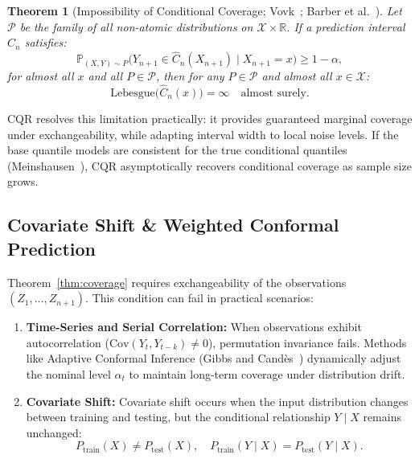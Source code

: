 \documentclass[journal]{IEEEtran}
\newtheorem{theorem}{Theorem}
\begin{document}
\begin{theorem}[Impossibility of Conditional Coverage; Vovk~\cite{vovk2012}; Barber et al.~\cite{barber2021}]\label{thm:impossibility}
Let $\mathcal{P}$ be the family of all non-atomic distributions on $\mathcal{X} \times \mathbb{R}$. If a prediction interval $\hat{C}_n$ satisfies:
\begin{equation}
\mathbb{P}_{(X, Y) \sim P}\big(Y_{n+1} \in \hat{C}_n(X_{n+1}) \mid X_{n+1} = x\big) \ge 1 - \alpha,
\end{equation}
for almost all $x$ and all $P \in \mathcal{P}$, then for any $P \in \mathcal{P}$ and almost all $x \in \mathcal{X}$:
\begin{equation}
\text{Lebesgue}\big(\hat{C}_n(x)\big) = \infty \quad \text{almost surely.}
\end{equation}
\end{theorem}

CQR resolves this limitation practically: it provides guaranteed marginal coverage under exchangeability, while adapting interval width to local noise levels. If the base quantile models are consistent for the true conditional quantiles (Meinshausen~\cite{meinshausen2006}), CQR asymptotically recovers conditional coverage as sample size grows.

\subsection{Covariate Shift \& Weighted Conformal Prediction}
Theorem~\ref{thm:coverage} requires exchangeability of the observations $(Z_1, \dots, Z_{n+1})$. This condition can fail in practical scenarios:
\begin{enumerate}
    \item \textbf{Time-Series and Serial Correlation:} When observations exhibit autocorrelation ($\text{Cov}(Y_t, Y_{t-k}) \ne 0$), permutation invariance fails. Methods like Adaptive Conformal Inference (Gibbs and Cand\`{e}s~\cite{gibbs2021}) dynamically adjust the nominal level $\alpha_t$ to maintain long-term coverage under distribution drift.
    \item \textbf{Covariate Shift:} Covariate shift occurs when the input distribution changes between training and testing, but the conditional relationship $Y \mid X$ remains unchanged:
    \begin{equation}
    P_{\text{train}}(X) \ne P_{\text{test}}(X), \quad P_{\text{train}}(Y \mid X) = P_{\text{test}}(Y \mid X).
    \end{equation}
\end{enumerate}
\end{document}
